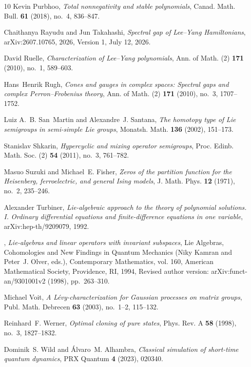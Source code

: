 \documentclass[reqno]{amsart}
\theoremstyle{definition}
\theoremstyle{remark}
\begin{document}
\begin{thebibliography}{10}
Kevin Purbhoo, \emph{Total nonnegativity and stable polynomials}, Canad. Math.
  Bull. \textbf{61} (2018), no.~4, 836--847.

Chaithanya Rayudu and Jun Takahashi, \emph{Spectral gap of {Lee--Yang
  Hamiltonians}}, arXiv:2607.10765, 2026, Version 1, July 12, 2026.

David Ruelle, \emph{Characterization of {Lee--Yang} polynomials}, Ann. of Math.
  (2) \textbf{171} (2010), no.~1, 589--603.

Hans~Henrik Rugh, \emph{Cones and gauges in complex spaces: Spectral gaps and
  complex {Perron--Frobenius} theory}, Ann. of Math. (2) \textbf{171} (2010),
  no.~3, 1707--1752.

Luiz A.~B. San~Martin and Alexandre~J. Santana, \emph{The homotopy type of
  {Lie} semigroups in semi-simple {Lie} groups}, Monatsh. Math. \textbf{136}
  (2002), 151--173.

Stanislav Shkarin, \emph{Hypercyclic and mixing operator semigroups}, Proc.
  Edinb. Math. Soc. (2) \textbf{54} (2011), no.~3, 761--782.

Masuo Suzuki and Michael~E. Fisher, \emph{Zeros of the partition function for
  the {Heisenberg}, ferroelectric, and general {Ising} models}, J. Math. Phys.
  \textbf{12} (1971), no.~2, 235--246.

Alexander Turbiner, \emph{{Lie}-algebraic approach to the theory of polynomial
  solutions. {I}. {Ordinary} differential equations and finite-difference
  equations in one variable}, arXiv:hep-th/9209079, 1992.

\bysame, \emph{{Lie}-algebras and linear operators with invariant subspaces},
  Lie Algebras, Cohomologies and New Findings in Quantum Mechanics (Niky Kamran
  and Peter~J. Olver, eds.), Contemporary Mathematics, vol. 160, American
  Mathematical Society, Providence, RI, 1994, Revised author version:
  arXiv:funct-an/9301001v2 (1998), pp.~263--310.

Michael Voit, \emph{A {L\'{e}vy}-characterization for {Gaussian} processes on
  matrix groups}, Publ. Math. Debrecen \textbf{63} (2003), no.~1--2, 115--132.

Reinhard~F. Werner, \emph{Optimal cloning of pure states}, Phys. Rev. A
  \textbf{58} (1998), no.~3, 1827--1832.

Dominik~S. Wild and {\'A}lvaro~M. Alhambra, \emph{Classical simulation of
  short-time quantum dynamics}, PRX Quantum \textbf{4} (2023), 020340.


\end{thebibliography}
\end{document}
